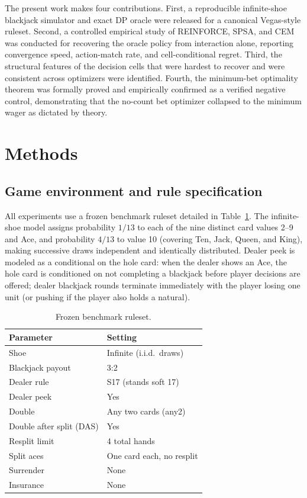 \documentclass[12pt]{article}
\begin{document}
The present work makes four contributions.  First, a reproducible infinite-shoe
blackjack simulator and exact DP oracle were released for a canonical Vegas-style
ruleset.  Second, a controlled empirical study of REINFORCE, SPSA, and CEM was
conducted for recovering the oracle policy from interaction alone, reporting
convergence speed, action-match rate, and cell-conditional regret.  Third, the
structural features of the decision cells that were hardest to recover and were
consistent across optimizers were identified.  Fourth, the minimum-bet optimality
theorem was formally proved and empirically confirmed as a verified negative control,
demonstrating that the no-count bet optimizer collapsed to the minimum wager as
dictated by theory.

\section{Methods}

\subsection{Game environment and rule specification}

All experiments use a frozen benchmark ruleset detailed in Table~\ref{tab:rules}.
The infinite-shoe model assigns probability $1/13$ to each of the nine distinct card
values 2--9 and Ace, and probability $4/13$ to value 10 (covering Ten, Jack, Queen,
and King), making successive draws independent and identically distributed.  Dealer
peek is modeled as a conditional on the hole card: when the dealer shows an Ace, the
hole card is conditioned on not completing a blackjack before player decisions are
offered; dealer blackjack rounds terminate immediately with the player losing one unit
(or pushing if the player also holds a natural).

\begin{table}[h]
\centering
\caption{Frozen benchmark ruleset.}
\label{tab:rules}
\small
\begin{tabular}{ll}
\toprule
Parameter & Setting \\
\midrule
Shoe & Infinite (i.i.d.\ draws) \\
Blackjack payout & 3:2 \\
Dealer rule & S17 (stands soft 17) \\
Dealer peek & Yes \\
Double & Any two cards (any2) \\
Double after split (DAS) & Yes \\
Resplit limit & 4 total hands \\
Split aces & One card each, no resplit \\
Surrender & None \\
Insurance & None \\
\bottomrule
\end{tabular}
\end{table}
\end{document}
